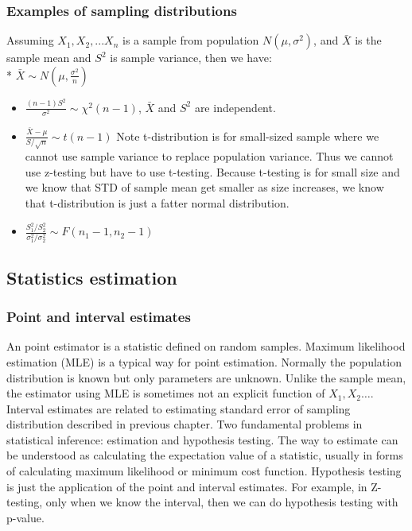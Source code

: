 \documentclass[11pt]{article}
\begin{document}
\subsubsection{Examples of sampling
distributions}\label{examples-of-sampling-distributions}

Assuming \(X_1, X_2,...X_n\) is a sample from population
\(N(\mu, \sigma^2)\), and \(\bar{X}\) is the sample mean and \(S^2\) is
sample variance, then we have:\\
* \(\bar{X} \sim N(\mu, \frac{\sigma^2}{n})\)

\begin{itemize}
\item
  \(\frac{(n-1)S^2}{\sigma^2} \sim \chi^2 (n-1)\), \(\bar{X}\) and
  \(S^2\) are independent.
\item
  \(\frac{\bar{X}-\mu}{S/\sqrt{n}} \sim t(n-1)\) Note t-distribution is
  for small-sized sample where we cannot use sample variance to replace
  population variance. Thus we cannot use z-testing but have to use
  t-testing. Because t-testing is for small size and we know that STD of
  sample mean get smaller as size increases, we know that t-distribution
  is just a fatter normal distribution.
\item
  \(\frac{S_1^2/S_2^2}{\sigma_1^2/\sigma_2^2} \sim F(n_1-1, n_2-1)\)
\end{itemize}

    \subsection{Statistics estimation}\label{statistics-estimation}

\subsubsection{Point and interval
estimates}\label{point-and-interval-estimates}

An point estimator is a statistic defined on random samples. Maximum
likelihood estimation (MLE) is a typical way for point estimation.
Normally the population distribution is known but only parameters are
unknown. Unlike the sample mean, the estimator using MLE is sometimes
not an explicit function of \(X_1, X_2…\). Interval estimates are
related to estimating standard error of sampling distribution described
in previous chapter. Two fundamental problems in statistical inference:
estimation and hypothesis testing. The way to estimate can be understood
as calculating the expectation value of a statistic, usually in forms of
calculating maximum likelihood or minimum cost function. Hypothesis
testing is just the application of the point and interval estimates. For
example, in Z-testing, only when we know the interval, then we can do
hypothesis testing with p-value.
\end{document}
